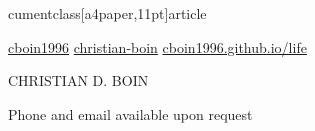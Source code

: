 cumentclass[a4paper,11pt]{article}
\usepackage{mystyle}
\usepackage{subfiles} 

\graphicspath{{./images/}{images/}} %
\newcommand{\name}{CHRISTIAN D. BOIN} %
\newcommand{\github}{cboin1996} %
\newcommand{\linkedin}{christian-boin-masc-ai-6b705a135} %


\selectfont


\newcommand{\iconspace}{0.4mm}
\newcommand{\headingsep}{1cm}
\begin{center}
	\small{\href{https://github.com/\github}{\faGithub \hspace{\iconspace} \github} \hspace{\headingsep}
		\href{https://www.linkedin.com/in/\linkedin/}{\faLinkedinSquare \hspace{\iconspace} christian-boin} \hspace{\headingsep}
		\href{https://cboin1996.github.io/life/}{\faFileCodeO \hspace{\iconspace} cboin1996.github.io/life}
	}
\end{center}
\begin{center}
	\vspace{-0.4cm}
	\huge{{\name}}
\end{center}
\begin{center}
	\vspace{-0.2cm}
	\tiny{
		Phone and email available upon request
	}
\end{center}
